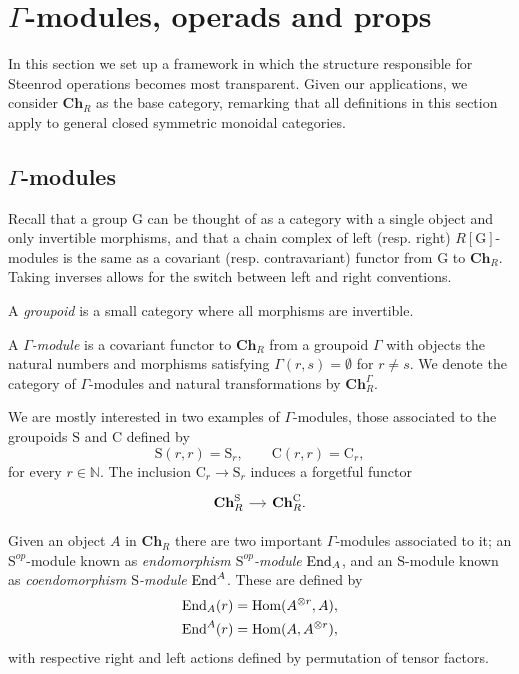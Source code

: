 
\section{$\Gamma$-modules, operads and props} \label{s:operads}

In this section we set up a framework in which the structure responsible for Steenrod operations becomes most transparent.
Given our applications, we consider $\mathbf{Ch}_R$ as the base category, remarking that all definitions in this section apply to general closed symmetric monoidal categories.

\subsection{$\Gamma$-modules}
Recall that a group $\mathrm G$ can be thought of as a category with a single object and only invertible morphisms, and that a chain complex of left (resp. right) $R[\mathrm G]$-modules is the same as a covariant (resp. contravariant) functor from $\mathrm G$ to $\mathbf{Ch}_R$.
Taking inverses allows for the switch between left and right conventions.

A \textit{groupoid} is a small category where all morphisms are invertible.
\begin{definition}
	A \textit{$\Gamma$-module} is a covariant functor to $\mathbf{Ch}_R$ from a groupoid $\Gamma$ with objects the natural numbers and morphisms satisfying $\Gamma(r,s) = \emptyset$ for $r \neq s$.
	We denote the category of $\Gamma$-modules and natural transformations by $\mathbf{Ch}_R^\Gamma$.
\end{definition}

We are mostly interested in two examples of $\Gamma$-modules, those associated to the groupoids $\mathrm{S}$ and $\mathrm{C}$ defined by
\begin{equation*}
\mathrm{S}(r, r) = \mathrm{S}_r, \qquad
\mathrm{C}(r,r) = \mathrm{C}_r,
\end{equation*}
for every $r \in \mathbb{N}$.
The inclusion $\mathrm{C}_r \to \mathrm{S}_r$ induces a forgetful functor
\begin{equation*}
\begin{tikzcd} [column sep = small]
\mathbf{Ch}_R^\mathrm{S} \arrow[r] & \mathbf{Ch}_R^\mathrm{C}.
\end{tikzcd}
\end{equation*}

Given an object $A$ in $\mathbf{Ch}_R$ there are two important $\Gamma$-modules associated to it; an $\mathrm{S}^{op}$-module known as \textit{endomorphism $\mathrm{S}^{op}$-module} $\mathrm{End}_A$, and an $\mathrm{S}$-module known as \textit{coendomorphism $\mathrm{S}$-module} $\mathrm{End}^A$.
These are defined by
\begin{align*}	
\mathrm{End}_A(r) &= \mathrm{Hom}(A^{\otimes r},A), \\
\mathrm{End}^A(r) &= \mathrm{Hom}(A,A^{\otimes r}),
\end{align*}
with respective right and left actions defined by permutation of tensor factors.

